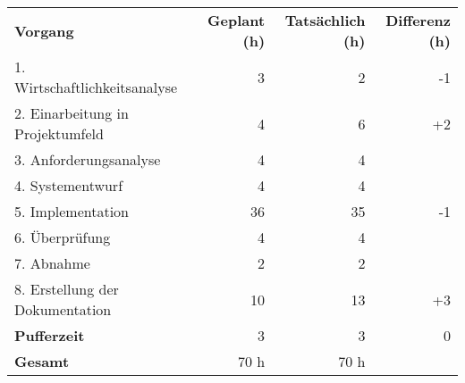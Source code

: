 \begin{tabular}{lrrr}
\rowcolor{KVGruen}\textbf{Vorgang} & \textbf{Geplant (h)} & \textbf{Tatsächlich (h)} & \textbf{Differenz (h)} \\
1. Wirtschaftlichkeitsanalyse & 3 & 2 & -1 \\
\rowcolor{KVGrau}2. Einarbeitung in Projektumfeld & 4   & 6  & +2 \\
3. Anforderungsanalyse & 4 & 4 & \\
\rowcolor{KVGrau}4. Systementwurf & 4   & 4   &  \\
5. Implementation & 36 & 35 & -1 \\
\rowcolor{KVGrau}6. Überprüfung & 4   & 4  &  \\
7. Abnahme & 2 & 2 &  \\
\rowcolor{KVGrau}8. Erstellung der Dokumentation & 10  & 13  & +3 \\
\textbf{Pufferzeit} & 3   & 3  & 0 \\
\hline
\hline
\rowcolor{KVGrau}\textbf{Gesamt} & 70 h  & 70 h  &  \\
\end{tabular}